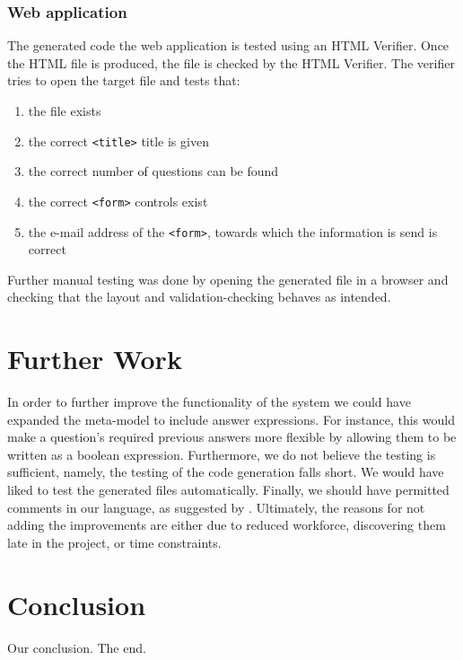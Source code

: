 \documentclass[runningheads]{llncs}
\begin{document}
\subsubsection{Web application}
The generated code the web application is tested using an HTML Verifier. Once the HTML file is produced, the file is checked by the HTML Verifier. The verifier tries to open the target file and tests that:
\begin{enumerate}
\item the file exists
\item the correct \texttt{<title>} title is given
\item the correct number of questions can be found
\item the correct \texttt{<form>} controls exist
\item the e-mail address of the \texttt{<form>}, towards which the information is send is correct
\end{enumerate}
Further manual testing was done by opening the generated file in a browser and checking that the layout and validation-checking behaves as intended.

\section{Further Work}
In order to further improve the functionality of the system we could have expanded the meta-model to include answer expressions. For instance, this would make a question's required previous answers more flexible by allowing them to be written as a boolean expression. Furthermore, we do not believe the testing is sufficient, namely, the testing of the code generation falls short. We would have liked to test the generated files automatically. Finally, we should have permitted comments in our language, as suggested by \cite{karsai}. Ultimately, the reasons for not adding the improvements are either due to reduced workforce, discovering them late in the project, or time constraints.

\section{Conclusion}
Our conclusion. The end.
\end{document}
